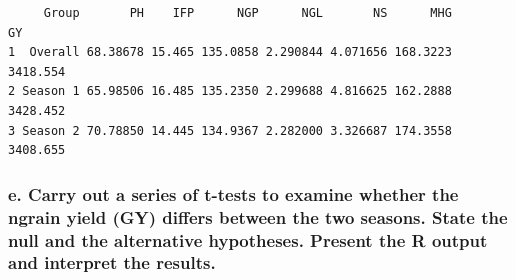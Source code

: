 \documentclass[
  letterpaper,
  DIV=11,
  numbers=noendperiod]{scrartcl}
\newenvironment{Shaded}{\begin{snugshade}}{\end{snugshade}}
\newcommand{\AttributeTok}[1]{\textcolor[rgb]{0.40,0.45,0.13}{#1}}
\newcommand{\CommentTok}[1]{\textcolor[rgb]{0.37,0.37,0.37}{#1}}
\newcommand{\FunctionTok}[1]{\textcolor[rgb]{0.28,0.35,0.67}{#1}}
\newcommand{\NormalTok}[1]{\textcolor[rgb]{0.00,0.23,0.31}{#1}}
\newcommand{\OtherTok}[1]{\textcolor[rgb]{0.00,0.23,0.31}{#1}}
\newcommand{\SpecialCharTok}[1]{\textcolor[rgb]{0.37,0.37,0.37}{#1}}
\newcommand{\StringTok}[1]{\textcolor[rgb]{0.13,0.47,0.30}{#1}}
\begin{document}
\begin{Shaded}
\end{Shaded}

\begin{verbatim}
     Group       PH    IFP      NGP      NGL       NS      MHG       GY
1  Overall 68.38678 15.465 135.0858 2.290844 4.071656 168.3223 3418.554
2 Season 1 65.98506 16.485 135.2350 2.299688 4.816625 162.2888 3428.452
3 Season 2 70.78850 14.445 134.9367 2.282000 3.326687 174.3558 3408.655
\end{verbatim}

\subsubsection{e. Carry out a series of t-tests to examine whether the
ngrain yield (GY) differs between the two seasons. State the null and
the alternative hypotheses. Present the R output and interpret the
results.}\label{e.-carry-out-a-series-of-t-tests-to-examine-whether-the-ngrain-yield-gy-differs-between-the-two-seasons.-state-the-null-and-the-alternative-hypotheses.-present-the-r-output-and-interpret-the-results.}
\end{document}
